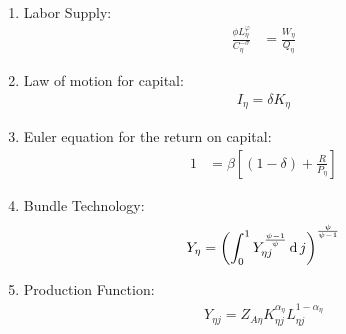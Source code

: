 \documentclass[../thesis.tex]{subfiles}
\begin{document}
\begin{enumerate}
	\item Labor Supply:
	\begin{align}
		\frac{\phi L_{\eta}^{\varphi}}{C_{\eta}^{-\sigma}} &= \frac{W_{\eta}}{Q_{\eta}} \label{eq_v2:reg-ss-labor-supply}
	\end{align}
	
	\item Law of motion for capital:
	\begin{align}
		I_{\eta} = \delta K_{\eta} \label{eq_v2:reg-ss-law-of-motion-of-capital}
	\end{align}		
	
	\item Euler equation for the return on capital:
	\begin{align}
		1 &= \beta \left[ (1 - \delta) + \frac{R}{P_{\eta}} \right] \label{eq_v2:reg-ss-capital-euler-equation}
	\end{align}
	
	\begin{comment}
			\item Region 1 Euler equation for the bonds return:
		\begin{align}
			\frac{\mathbb{E}_{t} \left\{Q_{1} C_{1}^{\sigma} \right\}}{Q_{1} C_{1}^{\sigma}} &= \beta (1 + R_{}) \implies \nonumber \\
			1 &= \beta (1 + R_{}) \label{eq_v2:reg-ss-bonds-euler-equation}
		\end{align}
		
		\item Euler equation for regional consumption:
		\begin{align}
			\frac{\mathbb{E}_{t} \left\{ Q_{1} C_{1}^{\sigma} \right\}}{Q_{1} C_{1}^{\sigma}} &= \frac{\mathbb{E}_{t} \left\{ Q_{2} C_{2}^{\sigma} \right\}}{Q_{2} C_{2}^{\sigma}} = 1 \label{eq_v2:reg-ss-bonds-euler-equation-2}
		\end{align}
	\end{comment}
	
	\item Bundle Technology:
	\begin{align}
		Y_{\eta} = \left( \int_{0}^{1} Y_{\eta j}^{\frac{\psi-1}{\psi}} \operatorname{d} j \right)^{\frac{\psi}{\psi-1}} \label{eq_v2:reg-ss-final-goods-firm-bundle-rule}
	\end{align}

	\item Production Function:
	\begin{align}
		Y_{\eta j} = Z_{A\eta} K_{\eta j}^{\alpha_{\eta}} L_{\eta j}^{1-{\alpha_{\eta}}} 
		\label{eq_v2:reg-ss-int-good-firm-prod-function}
	\end{align}
	

\end{enumerate}
\end{document}
